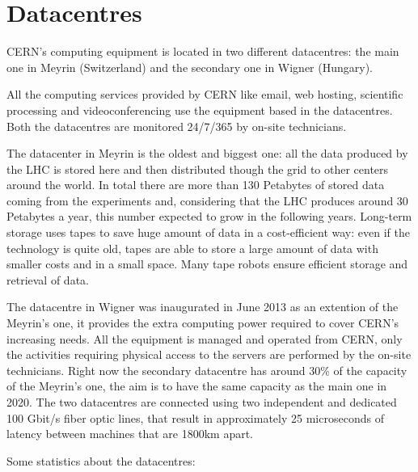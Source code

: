 \section{Datacentres}

CERN's computing equipment is located in two different datacentres: the
main one in Meyrin (Switzerland) and the secondary one in Wigner
(Hungary).

All the computing services provided by CERN like email, web hosting,
scientific processing and videoconferencing use the equipment based in the
datacentres. Both the datacentres are monitored 24/7/365 by on-site
technicians.

The datacenter in Meyrin is the oldest and biggest one: all the data
produced by the LHC is stored here and then distributed though the grid to
other centers around the world. In total there are more than 130 Petabytes
of stored data coming from the experiments and, considering that the LHC
produces around 30 Petabytes a year, this number expected to grow in the
following years. Long-term storage uses tapes to save huge amount of data
in a cost-efficient way: even if the technology is quite old, tapes are
able to store a large amount of data with smaller costs and in a small
space. Many tape robots ensure efficient storage and retrieval of data.

The datacentre in Wigner was inaugurated in June 2013 as an extention of
the Meyrin's one, it provides the extra computing power required to cover
CERN's increasing needs. All the equipment is managed and operated from
CERN, only the activities requiring physical access to the servers are
performed by the on-site technicians. Right now the secondary datacentre
has around 30\% of the capacity of the Meyrin's one, the aim is to have
the same capacity as the main one in 2020. The two datacentres are
connected using two independent and dedicated 100 Gbit/s fiber optic
lines, that result in approximately 25 microseconds of latency between
machines that are 1800km apart.

Some statistics about the datacentres:

